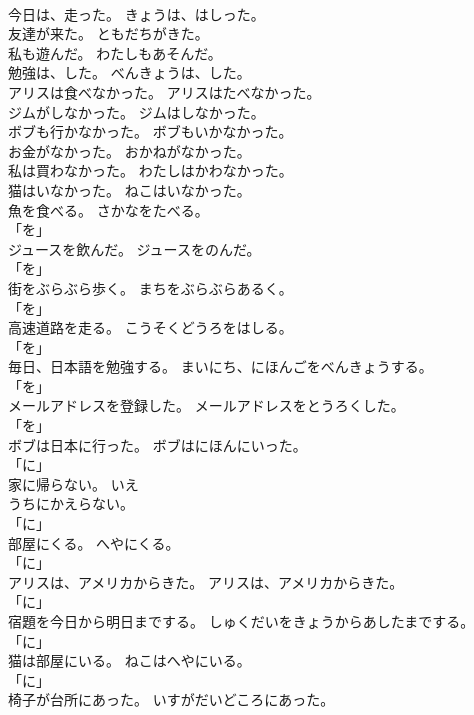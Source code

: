 \documentclass[8pt]{extreport}
\begin{document}
\begin{CJK}{UTF8}{min}
\\	今日は、走った。	きょうは、はしった。	
\\	友達が来た。	ともだちがきた。	
\\	私も遊んだ。	わたしもあそんだ。	
\\	勉強は、した。	べんきょうは、した。	
\\	アリスは食べなかった。	アリスはたべなかった。	
\\	ジムがしなかった。	ジムはしなかった。	
\\	ボブも行かなかった。	ボブもいかなかった。	
\\	お金がなかった。	おかねがなかった。	
\\	私は買わなかった。	わたしはかわなかった。	
\\	猫はいなかった。	ねこはいなかった。	
\\	魚を食べる。	さかなをたべる。	
\\	「を」 
\\	ジュースを飲んだ。	ジュースをのんだ。	
\\	「を」 
\\	街をぶらぶら歩く。	まちをぶらぶらあるく。	
\\	「を」 
\\	高速道路を走る。	こうそくどうろをはしる。	
\\	「を」 
\\	毎日、日本語を勉強する。	まいにち、にほんごをべんきょうする。	
\\	「を」 
\\	メールアドレスを登録した。	メールアドレスをとうろくした。	
\\	「を」 
\\	ボブは日本に行った。	ボブはにほんにいった。	
\\	「に」 
\\	家に帰らない。	{いえ
\\	うち}にかえらない。	
\\	「に」 
\\	部屋にくる。	へやにくる。	
\\	「に」 
\\	アリスは、アメリカからきた。	アリスは、アメリカからきた。	
\\	「に」 
\\	宿題を今日から明日までする。	しゅくだいをきょうからあしたまでする。	
\\	「に」 
\\	猫は部屋にいる。	ねこはへやにいる。	
\\	「に」 
\\	椅子が台所にあった。	いすがだいどころにあった。	

\end{CJK}
\end{document}
